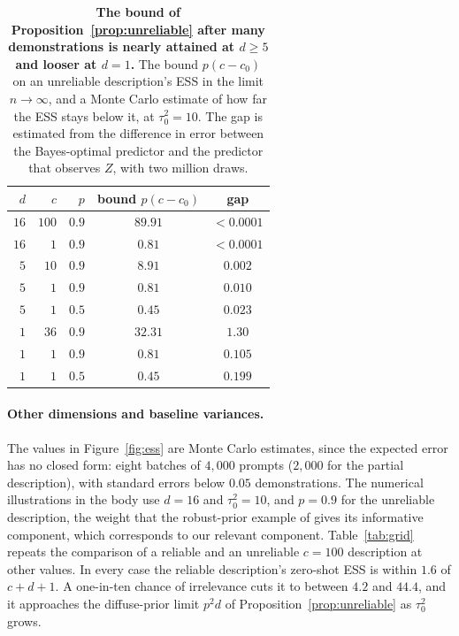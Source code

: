 \documentclass{article}
\theoremstyle{definition}
\begin{document}
\begin{table}[!htb]
\centering\small
\caption{\textbf{The bound of Proposition~\ref{prop:unreliable} after many demonstrations is nearly attained at $d\geq5$ and looser at $d=1$.} The bound $p(c-c_0)$ on an unreliable description's ESS in the limit $n\to\infty$, and a Monte Carlo estimate of how far the ESS stays below it, at $\tau_0^2=10$. The gap is estimated from the difference in error between the Bayes-optimal predictor and the predictor that observes $Z$, with two million draws.}
\label{tab:gap}
\vspace{3pt}
\begin{tabular}{rrrcc}
\toprule
$d$ & $c$ & $p$ & bound $p(c-c_0)$ & gap \\
\midrule
$16$ & $100$ & $0.9$ & $89.91$ & $<0.0001$ \\
$16$ & $1$ & $0.9$ & $0.81$ & $<0.0001$ \\
$5$ & $10$ & $0.9$ & $8.91$ & $0.002$ \\
$5$ & $1$ & $0.9$ & $0.81$ & $0.010$ \\
$5$ & $1$ & $0.5$ & $0.45$ & $0.023$ \\
$1$ & $36$ & $0.9$ & $32.31$ & $1.30$ \\
$1$ & $1$ & $0.9$ & $0.81$ & $0.105$ \\
$1$ & $1$ & $0.5$ & $0.45$ & $0.199$ \\
\bottomrule
\end{tabular}
\end{table}

\paragraph{Other dimensions and baseline variances.}
The values in Figure~\ref{fig:ess} are Monte Carlo estimates, since the expected error has no closed form: eight batches of $4{,}000$ prompts ($2{,}000$ for the partial description), with standard errors below $0.05$ demonstrations. The numerical illustrations in the body use $d=16$ and $\tau_0^2=10$, and $p=0.9$ for the unreliable description, the weight that the robust-prior example of \citet{schmidli2014} gives its informative component, which corresponds to our relevant component. Table~\ref{tab:grid} repeats the comparison of a reliable and an unreliable $c=100$ description at other values. In every case the reliable description's zero-shot ESS is within $1.6$ of $c+d+1$. A one-in-ten chance of irrelevance cuts it to between $4.2$ and $44.4$, and it approaches the diffuse-prior limit $p^2d$ of Proposition~\ref{prop:unreliable} as $\tau_0^2$ grows.
\end{document}
